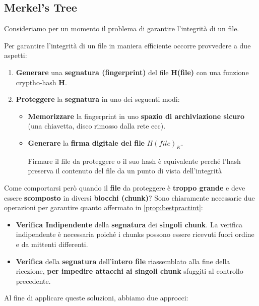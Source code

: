 \subsection{Merkel's Tree}
Consideriamo per un momento il problema di garantire l'integrità di un file. 
\begin{proposition}\label{prop:bestpractint}
Per garantire l'integrità di un file in maniera efficiente occorre provvedere a due aspetti:
\begin{enumerate}
    \item \textbf{Generare} una \textbf{segnatura (fingerprint)} del file \textbf{H(file)} con una funzione cryptho-hash \textbf{H}.
    \item \textbf{Proteggere} la \textbf{segnatura} in uno dei seguenti modi:
    \begin{itemize}
        \item \textbf{Memorizzare} la fingerprint in uno \textbf{spazio di archiviazione sicuro} (una chiavetta, disco rimosso dalla rete ecc).
        \item \textbf{Generare} la \textbf{firma digitale del file} $H(file)_K$.
        \begin{remark}
            Firmare il file da proteggere o il suo hash è equivalente perché l'hash preserva il contenuto del file da un punto di vista dell'integrità
        \end{remark}
    \end{itemize}
\end{enumerate}
\end{proposition}
Come comportarsi però quando il \textbf{file} da proteggere è \textbf{troppo grande} e deve essere \textbf{scomposto} in diversi \textbf{blocchi (chunk)}? Sono chiaramente necessarie due operazioni per garantire quanto affermato in \cref{prop:bestpractint}:
\begin{itemize}
    \item \textbf{Verifica Indipendente} della \textbf{segnatura} dei \textbf{singoli chunk}. La verifica indipendente è necessaria poiché i chunks possono essere ricevuti fuori ordine e da mittenti differenti.
    \item \textbf{Verifica} della \textbf{segnatura} dell'\textbf{intero file} riassemblato alla fine della ricezione, \textbf{per impedire attacchi ai singoli chunk} sfuggiti al controllo precedente.
\end{itemize}
Al fine di applicare queste soluzioni, abbiamo due approcci:
